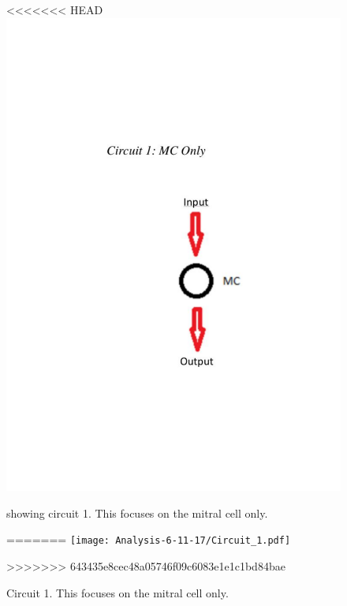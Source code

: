 \documentclass[11pt]{report}
\begin{document}
\begin{figure}[!ht]
\centering
<<<<<<< HEAD
\includegraphics[trim={0 6cm 0 8cm},clip, scale=0.5]{images/2017-11-06/Circuit_1.pdf}
\caption{showing circuit 1. This focuses on the mitral cell only.}
=======
\texttt{[image: Analysis-6-11-17/Circuit\_1.pdf]}
\caption{Circuit 1. This focuses on the mitral cell only.}
>>>>>>> 643435e8cec48a05746f09c6083e1e1c1bd84bae
\end{figure} 
\end{document}
